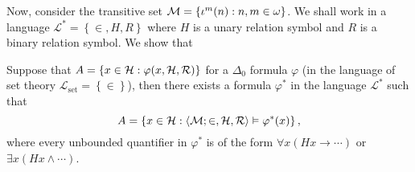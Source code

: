 \documentclass[11pt]{article}
\theoremstyle{plain}
\theoremstyle{definition}
\newcommand{\tuple}[1]{\left\langle #1 \right\rangle}
\begin{document}
Now, consider the transitive set $\mathcal{M} = \left\{\iota^m\mleft(n\mright) : n, m \in \omega\right\}$. We shall work in a language $\mathcal{L}^* = \left\{\in, H, R\right\}$ where $H$ is a unary relation symbol and $R$ is a binary relation symbol. We show that

\begin{lemma}
  Suppose that $A = \left\{x \in \mathcal{H} : \varphi\mleft(x, \mathcal{H}, \mathcal{R}\mright)\right\}$ for a $\Delta_0$ formula $\varphi$ (in the language of set theory $\mathcal{L}_\mathrm{set} = \left\{\in\right\}$), then there exists a formula $\varphi^*$ in the language $\mathcal{L}^*$ such that
  \[A = \left\{x \in \mathcal{H} : \tuple{\mathcal{M}; \in, \mathcal{H}, \mathcal{R}} \vDash \varphi^*\mleft(x\mright)\right\},\]
  where every unbounded quantifier in $\varphi^*$ is of the form $\forall x \left(Hx \rightarrow \cdots\right)$ or $\exists x \left(Hx \land \cdots\right)$.
\end{lemma}
\end{document}
